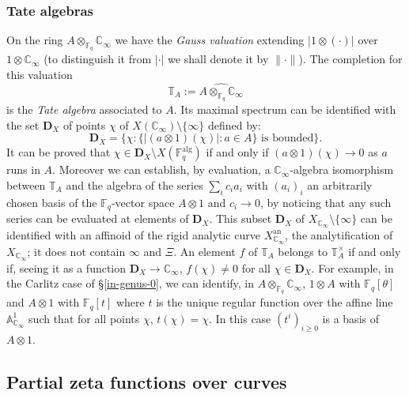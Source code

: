 \documentclass[11pt]{amsart}
\numberwithin{equation}{section}
\newcommand{\FF}{\mathbb{F}}
\newcommand{\CC}{\mathbb{C}}
\newcommand{\TT}{\mathbb{T}}
\begin{document}
\subsubsection{Tate algebras}

On the ring $A\otimes_{\FF_q}\CC_\infty$ we have the {\em Gauss valuation} extending $|1\otimes(\cdot)|$
over $1\otimes\CC_\infty$ (to distinguish it from $|\cdot|$ we shall denote it by $\|\cdot\|$). The completion for this valuation
$$\TT_A:=\widehat{A\otimes_{\FF_q}\CC_\infty}$$
is the {\em Tate algebra} associated to $A$. Its maximal spectrum can be identified with the set $\boldsymbol{D}_X$ of points $\chi$ of 
$X(\CC_\infty)\setminus\{\infty\}$ defined by:
\begin{equation}\label{DX}
\boldsymbol{D}_X=\{\chi:\{|(a\otimes1)(\chi)|:a\in A\}\text{ is bounded}\}.
\end{equation}
It can be proved that $\chi\in\boldsymbol{D}_X\setminus X(\FF_q^{\text{alg}})$ if and only if $(a\otimes1)(\chi)\rightarrow0$ as $a$ runs in $A$. Moreover
we can establish, by evaluation, a $\CC_\infty$-algebra isomorphism between $\TT_A$ and the algebra of the series $\sum_ic_ia_i$
with $(a_i)_i$ an arbitrarily chosen basis of the $\FF_q$-vector space $A\otimes1$ and $c_i\rightarrow0$, by noticing that any such series can be 
evaluated at elements of $\boldsymbol{D}_X$.
 This subset $\boldsymbol{D}_X$ of $X_{\CC_\infty}\setminus\{\infty\}$ can be identified with an affinoid of the rigid analytic curve $X^{\text{an}}_{\CC_\infty}$, the analytification of $X_{\CC_\infty}$; it does not contain $\infty$ and $\Xi$.
An element $f$ of $\TT_A$ belongs to $\TT_A^\times$ if and only if, seeing it as a function $\boldsymbol{D}_X\rightarrow\CC_\infty$, $f(\chi)\neq0$ for all $\chi\in \boldsymbol{D}_X$.
For example, in the Carlitz case of \S \ref{in-genus-0}, we can identify, in $A\otimes_{\FF_q}\CC_\infty$, $1\otimes A$ with $\FF_q[\theta]$ and $A\otimes 1$ with $\FF_q[t]$ where $t$ is the unique regular function over the affine line $\mathbb{A}_{\CC_\infty}^1$
such that for all points $\chi$, $t(\chi)=\chi$. In this case $(t^i)_{i\geq0}$ is a basis of $A\otimes1$.

\subsection{Partial zeta functions over curves}
\end{document}
